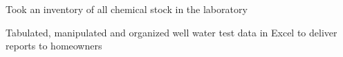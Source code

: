 \begin{job}

  \item Took an inventory of all chemical stock in the laboratory
  \item Tabulated, manipulated and organized well water test data in Excel to
  deliver reports to homeowners
\end{job}
